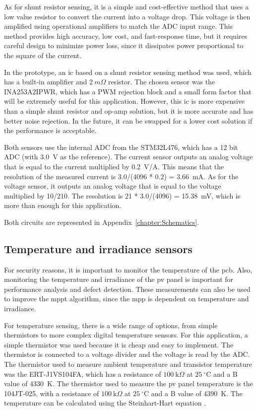     As for shunt resistor sensing, it is a simple and cost-effective method that uses a low value resistor to convert the current into a voltage drop. This voltage is then amplified using operational amplifiers to match the ADC input range. This method provides high accuracy, low cost, and fast-response time, but it requires careful design to minimize power loss, since it dissipates power proportional to the square of the current.

    In the prototype, an \ac{ic} based on a shunt resistor sensing method was used, which has a built-in amplifier and $2~m\Omega$ resistor. The chosen sensor was the INA253A2IPWR, which has a PWM rejection block and a small form factor that will be extremely useful for this application. However, this \ac{ic} is more expensive than a simple shunt resistor and op-amp solution, but it is more accurate and has better noise rejection. In the future, it can be swapped for a lower cost solution if the performance is acceptable.

    Both sensors use the internal ADC from the STM32L476, which has a 12 bit ADC (with 3.0~V as the reference). The current sensor outputs an analog voltage that is equal to the current multiplied by 0.2~V/A. This means that the resolution of the measured current is 3.0/(4096 * 0.2) = 3.66~mA. As for the voltage sensor, it outputs an analog voltage that is equal to the voltage multiplied by 10/210. The resolution is 21 * 3.0/(4096) = 15.38~mV, which is more than enough for this application.

    Both circuits are represented in Appendix~\ref{chapter:Schematics}.

\subsection{Temperature and irradiance sensors}
    For security reasons, it is important to monitor the temperature of the \ac{pcb}. Also, monitoring the temperature and irradiance of the \ac{pv} panel is important for performance analysis and defect detection. These measurements can also be used to improve the \ac{mppt} algorithm, since the \ac{mpp} is dependent on temperature and irradiance.

    For temperature sensing, there is a wide range of options, from simple thermistors to more complex digital temperature sensors. For this application, a simple thermistor was used because it is cheap and easy to implement. The thermistor is connected to a voltage divider and the voltage is read by the ADC. The thermistor used to measure ambient temperature and transistor temperature was the ERT-J1VS104FA, which has a resistance of $100~\mathrm{k}\Omega$ at $25~^\circ\mathrm{C}$ and a B value of 4330~K. The thermistor used to measure the \ac{pv} panel temperature is the 104JT-025, with a resistance of $100~\mathrm{k}\Omega$ at $25~^\circ\mathrm{C}$ and a B value of 4390~K. 
    The temperature can be calculated using the Steinhart-Hart equation \cite{arduinodiy2015ntc}.

